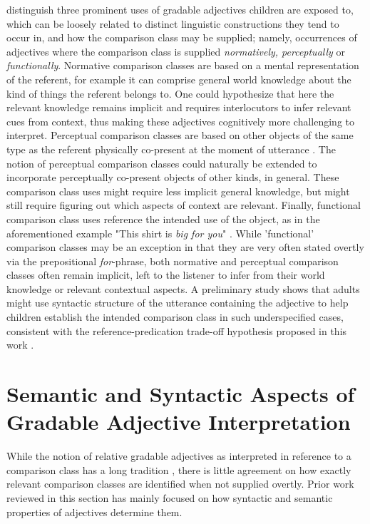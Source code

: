 \textcite{ebeling1994children} distinguish three prominent uses of gradable adjectives children are exposed to, which can be loosely related to distinct linguistic constructions they tend to occur in, and how the comparison class may be supplied; namely, occurrences of adjectives where the comparison class is supplied \textit{normatively, perceptually} or \textit{functionally}. 
Normative comparison classes are based on a mental representation of the referent, for example it can comprise general world knowledge about the kind of things the referent belongs to. One could hypothesize that here the relevant knowledge remains implicit and requires interlocutors to infer relevant cues from context, thus making these adjectives cognitively more challenging to interpret. 
Perceptual comparison classes are based on other objects of the same type as the referent physically co-present at the moment of utterance \parencite{ebeling1994children}. The notion of perceptual comparison classes could naturally be extended to incorporate perceptually co-present objects of other kinds, in general. These comparison class uses might require less implicit general knowledge, but might still require figuring out which aspects of context are relevant. 
Finally, functional comparison class uses reference the intended use of the object, as in the aforementioned example "This shirt is \emph{big for you}" \parencite{ebeling1994children, sera1987}. 
While 'functional' comparison classes may be an exception in that they are very often stated overtly via the prepositional \textit{for}-phrase, both normative and perceptual comparison classes often remain implicit, left to the listener to infer from their world knowledge or relevant contextual aspects. 
A preliminary study shows that adults might use syntactic structure of the utterance containing the adjective to help children establish the intended comparison class in such underspecified cases, consistent with the reference-predication trade-off hypothesis proposed in this work \parencite[discussed in greater detail in Chapter \ref{chapter06}]{sinelnikova2020}. 

\section{Semantic and Syntactic Aspects of Gradable Adjective Interpretation}
\label{2.3.}

While the notion of relative gradable adjectives as interpreted in reference to a comparison class has a long tradition \parencite[e.g.,][]{bartsch1972, Bierwisch1989}, there is little agreement on how exactly relevant comparison classes are identified when not supplied overtly. Prior work reviewed in this section has mainly focused on how syntactic and semantic properties of adjectives determine them.

